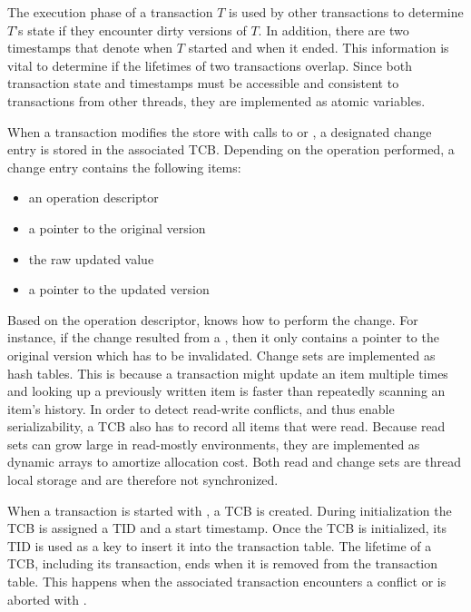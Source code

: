 The execution phase of a transaction $T$ is used by other transactions to determine $T$'s state if they encounter dirty versions of $T$. In addition, there are two timestamps that denote when $T$ started and when it ended. This information is vital to determine if the lifetimes of two transactions overlap. Since both transaction state and timestamps must be accessible and consistent to transactions from other threads, they are implemented as atomic variables.

When a transaction modifies the store with calls to  or , a designated change entry is stored in the associated TCB. Depending on the operation performed, a change entry contains the following items:

\begin{itemize}
    \item an operation descriptor
    \item a pointer to the original version
    \item the raw updated value
    \item a pointer to the updated version
\end{itemize}

Based on the operation descriptor, knows how to perform the change. For instance, if the change resulted from a , then it only contains a pointer to the original version which has to be invalidated. Change sets are implemented as hash tables. This is because a transaction might update an item multiple times and looking up a previously written item is faster than repeatedly scanning an item's history. In order to detect read-write conflicts, and thus enable serializability, a TCB also has to record all items that were read. Because read sets can grow large in read-mostly environments, they are implemented as dynamic arrays to amortize allocation cost. Both read and change sets are thread local storage and are therefore not synchronized.

When a transaction is started with , a TCB is created. During initialization the TCB is assigned a TID and a start timestamp.  Once the TCB is initialized, its TID is used as a key to insert it into the transaction table. The lifetime of a TCB, including its transaction, ends when it is removed from the transaction table. This happens when the associated transaction encounters a conflict or is aborted with .


